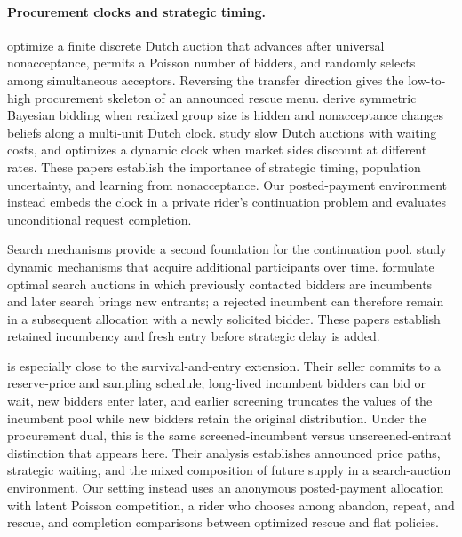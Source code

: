 \documentclass[mnsc,blindrev]{informs3}
\begin{document}
\paragraph{Procurement clocks and strategic timing.}
\citet{LiKuo2013} optimize a finite discrete Dutch auction that advances after
universal nonacceptance, permits a Poisson number of bidders, and randomly
selects among simultaneous acceptors.  Reversing the transfer direction gives
the low-to-high procurement skeleton of an announced rescue menu.
\citet{BuchananEtAl2016} derive symmetric Bayesian bidding when realized group
size is hidden and nonacceptance changes beliefs along a multi-unit Dutch
clock.  \citet{CarareRothkopf2005} study slow Dutch auctions with waiting
costs, and \citet{Shneyerov2014} optimizes a dynamic clock when market sides
discount at different rates.  These papers establish the importance of
strategic timing, population uncertainty, and learning from nonacceptance.
Our posted-payment environment instead embeds the clock in a private rider's
continuation problem and evaluates unconditional request completion.

Search mechanisms provide a second foundation for the continuation pool.
\citet{McAfeeMcMillan1988} study dynamic mechanisms that acquire additional
participants over time.  \citet{CremerEtAl2007} formulate optimal search
auctions in which previously contacted bidders are incumbents and later
search brings new entrants; a rejected incumbent can therefore remain in a
subsequent allocation with a newly solicited bidder.  These papers establish
retained incumbency and fresh entry before strategic delay is added.

\citet{LeeLi2023} is especially close to the survival-and-entry extension.
Their seller commits to a reserve-price and sampling schedule; long-lived
incumbent bidders can bid or wait, new bidders enter later, and earlier
screening truncates the values of the incumbent pool while new bidders retain
the original distribution.  Under the procurement dual, this is the same
screened-incumbent versus unscreened-entrant distinction that appears here.
Their analysis establishes announced price paths, strategic waiting, and the
mixed composition of future supply in a search-auction environment.  Our
setting instead uses an anonymous posted-payment allocation with latent Poisson
competition, a rider who chooses among abandon, repeat, and rescue, and
completion comparisons between optimized rescue and flat policies.
\end{document}
